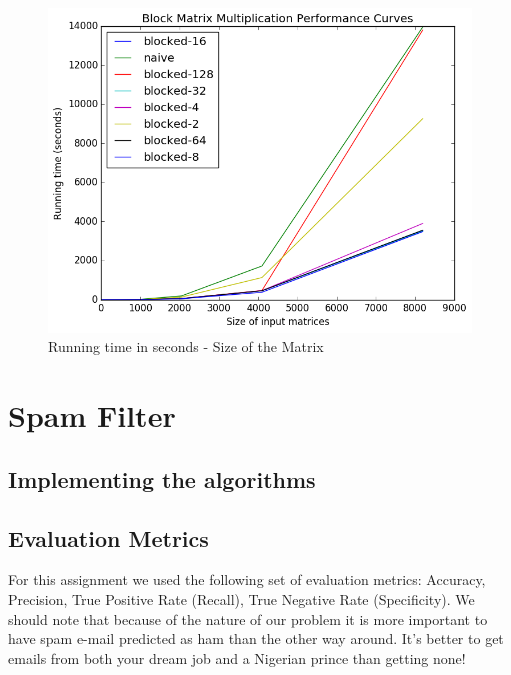 \documentclass[12pt]{article}
\begin{document}
\begin{figure}[h]
    \centering
    \includegraphics[scale=.8]{graphnew}
    \caption{Running time in seconds - Size of the Matrix}
    \label{Figure 1}
\end{figure}

\section{Spam Filter}

\subsection{Implementing the algorithms}


\subsection{Evaluation Metrics}

For this assignment we used the following set of evaluation metrics: Accuracy, Precision, True Positive Rate (Recall), True Negative Rate (Specificity). We should note that because of the nature of our problem it is more important to have spam e-mail predicted as ham than the other way around. It's better to get emails from both your dream job and a Nigerian prince than getting none!
\end{document}
